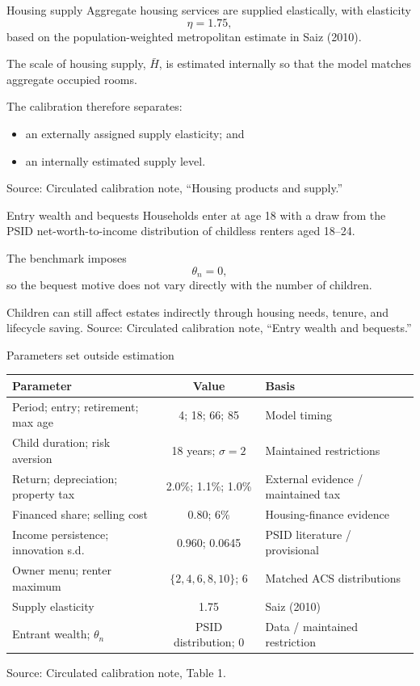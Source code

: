 \documentclass[aspectratio=169,11pt]{beamer}
\newcommand{\source}[1]{\vfill{\color{Muted}\tiny Source: #1}}
\newcommand{\tightitems}{\setlength{\itemsep}{0.55em}}
\begin{document}
\begin{frame}{Housing supply}
  \large
  Aggregate housing services are supplied elastically, with elasticity
  \[
    \eta=1.75,
  \]
  based on the population-weighted metropolitan estimate in Saiz (2010).

  \vspace{0.8em}
  The scale of housing supply, $\bar H$, is estimated internally so that the model matches aggregate occupied rooms.

  \vspace{0.8em}
  The calibration therefore separates:
  \begin{itemize}\tightitems
    \item an externally assigned supply elasticity; and
    \item an internally estimated supply level.
  \end{itemize}
  \source{Circulated calibration note, ``Housing products and supply.''}
\end{frame}

\begin{frame}{Entry wealth and bequests}
  \large
  Households enter at age 18 with a draw from the PSID net-worth-to-income distribution of childless renters aged 18--24.

  \vspace{0.8em}
  The benchmark imposes
  \[
    \theta_n=0,
  \]
  so the bequest motive does not vary directly with the number of children.

  \vspace{0.8em}
  Children can still affect estates indirectly through housing needs, tenure, and lifecycle saving.
  \source{Circulated calibration note, ``Entry wealth and bequests.''}
\end{frame}

\begin{frame}{Parameters set outside estimation}
  \small
  \centering
  \begin{tabularx}{\textwidth}{YcY}
    \toprule
    Parameter & Value & Basis\\
    \midrule
    Period; entry; retirement; max age & 4; 18; 66; 85 & Model timing\\
    Child duration; risk aversion & 18 years; $\sigma=2$ & Maintained restrictions\\
    Return; depreciation; property tax & 2.0\%; 1.1\%; 1.0\% & External evidence / maintained tax\\
    Financed share; selling cost & 0.80; 6\% & Housing-finance evidence\\
    Income persistence; innovation s.d. & 0.960; 0.0645 & PSID literature / provisional\\
    Owner menu; renter maximum & $\{2,4,6,8,10\}$; 6 & Matched ACS distributions\\
    Supply elasticity & 1.75 & Saiz (2010)\\
    Entrant wealth; $\theta_n$ & PSID distribution; 0 & Data / maintained restriction\\
    \bottomrule
  \end{tabularx}
  \source{Circulated calibration note, Table 1.}
\end{frame}
\end{document}
